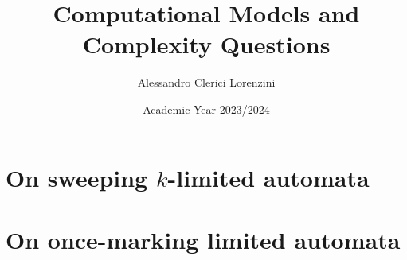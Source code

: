 \documentclass[a4paper]{report}
\title{Computational Models and Complexity Questions}
\author{Alessandro Clerici Lorenzini}
\date{Academic Year 2023/2024}
\begin{document}
\maketitle

\tableofcontents




\part{On sweeping \texorpdfstring{$k$}{k}-limited automata}



\part{On once-marking limited automata}



\printbibliography
\end{document}
